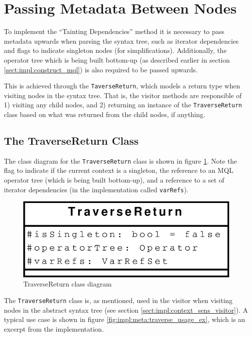 \section{Passing Metadata Between Nodes}
To implement the ``Tainting Dependencies'' method it is necessary to pass
metadata upwards when parsing the syntax tree, such as
iterator dependencies and flags to indicate singleton nodes (for simplifications). Additionally, the
operator tree which is being built bottom-up (as described earlier in section
\ref{sect:impl:construct_mql}) is also required to be passed upwards. 

This is achieved through the \texttt{TaverseReturn}, which models a return type
when visiting nodes in the syntax tree. That is, the visitor methods are
responsible of 1) visiting any child nodes, and 2) returning an instance of the
\texttt{TraverseReturn} class based on what was returned from the child nodes,
if anything.

\subsection{The TraverseReturn Class}
The class diagram for the \texttt{TraverseReturn} class is shown in figure
\ref{fig:impl:meta:traverse_uml}. Note the flag to indicate if the current
context is a singleton, the reference to an MQL operator tree (which is being
built bottom-up), and a reference to a set of iterator dependencies (in the implementation called
\texttt{varRefs}).

\begin{figure}[!htp]
\begin{center}
  \includegraphics[scale=0.5]{diagrams/traversereturn_uml}
  \caption{TraverseReturn class diagram}
  \label{fig:impl:meta:traverse_uml}
\end{center}
\end{figure}

The \texttt{TraverseReturn} class is, as mentioned, used in the visitor when
visiting nodes in the abstract syntax tree (see section
\ref{sect:impl:context_sens_visitor}). A typical use case is shown in figure
\ref{fig:impl:meta:traverse_usage_ex}, which is an excerpt from the
implementation.


